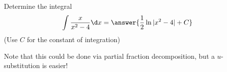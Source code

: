 \documentclass{ximera}
\author{Jason Miller}
\begin{document}
\begin{exercise}
Determine the integral
\[
\int \frac{x}{x^{2}-4} \d x=\answer{ \frac{1}{2} \ln|x^{2}-4|+ C}
\]
(Use $C$ for the constant of integration)

\begin{feedback}
Note that this could be done via partial fraction decomposition, but a $u$-substitution is easier!
\end{feedback}
\end{exercise}
\end{document}
